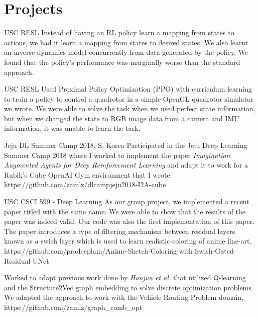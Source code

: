 \documentclass{cv}
\begin{document}
\section{Projects}
\begin{adjustwidth}{0.5cm}{0.5cm}

{USC RESL}
{Instead of having an RL policy learn a mapping from states to actions, we had
it learn a mapping from states to desired states. We also learnt an inverse
dynamics model concurrently from data generated by the policy. We found that
the policy's performance was marginally worse than the standard approach.}{}

{USC RESL}
{Used Proximal Policy Optimization (PPO) with curriculum learning to train a
policy to control a quadrotor in a simple OpenGL quadrotor simulator we wrote.
We were able to solve the task when we used perfect state information, but when
we changed the state to RGB image data from a camera and IMU information, it
was unable to learn the task.}{}

{Jeju DL Summer Camp 2018, S. Korea}
{Participated in the Jeju Deep Learning Summer Camp 2018 where I worked to
implement the paper \textit{Imagination Augmented Agents for
Deep Reinforcement Learning} and adapt it to work for a Rubik's Cube OpenAI
Gym environment that I wrote.}
{https://github.com/zamlz/dlcampjeju2018-I2A-cube}

{USC CSCI 599 - Deep Learning}
{As our group project, we implemented a recent paper titled with the same name.
We were able to show that the results of the paper was indeed valid. Our code
was also the first implementation of this paper. The paper introduces a type of
filtering mechanism between residual layers known as a swish layer which is
used to learn realistic coloring of anime line-art.}
{https://github.com/pradeeplam/Anime-Sketch-Coloring-with-Swish-Gated-Residual-UNet}

{Worked to adapt previous work done by \textit{Hanjun et al.} that utilized
Q-learning and the Structure2Vec graph embedding to solve discrete optimization
problems. We adapted the approach to work with the Vehicle Routing Problem
domain.}
{https://github.com/zamlz/graph_comb_opt}


\end{adjustwidth}
\end{document}
